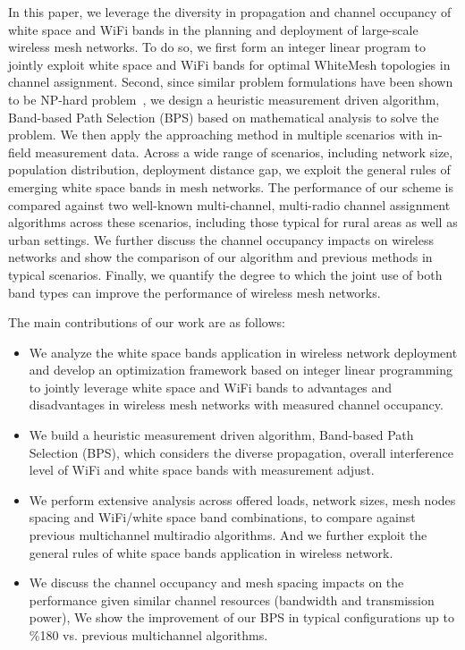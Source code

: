 In this paper, we leverage the diversity in propagation and channel occupancy of
white space and WiFi bands in the planning and deployment
of large-scale wireless mesh networks. To do so, we first form an
integer linear program to jointly exploit white space and WiFi 
bands for optimal WhiteMesh topologies in channel assignment. 
Second, since similar problem formulations have been shown to 
be NP-hard problem~\cite{jain2005impact,doraghinejad2014channel}, 
we design a heuristic measurement driven algorithm, Band-based 
Path Selection (BPS) based on mathematical analysis to solve the problem. 
We then apply the approaching method in multiple scenarios with in-field
measurement data. Across a wide range of scenarios, including 
network size, population distribution, deployment distance gap, we 
exploit the general rules of emerging white space bands in mesh networks. 
The performance of our scheme is compared against two well-known 
multi-channel, multi-radio channel assignment algorithms across 
these scenarios, including those typical for rural areas as well 
as urban settings. We further discuss the channel occupancy 
impacts on wireless networks and show the comparison of our
algorithm and previous methods in typical scenarios. 
Finally, we quantify the degree to which the joint use of 
both band types can improve the performance of wireless mesh networks.


The main contributions of our work are as follows:
\begin{itemize}
\item We analyze the white space bands application in wireless 
network deployment and develop an optimization framework based on integer
linear programming to jointly leverage white space and WiFi bands
to advantages and disadvantages in wireless mesh networks with measured 
channel occupancy.  
\item We build a heuristic measurement driven algorithm, Band-based Path 
Selection (BPS), which considers the diverse propagation, overall interference 
level of WiFi and white space bands with measurement adjust.  
\item We perform extensive analysis across offered loads,
network sizes, mesh nodes spacing and WiFi/white space band combinations, to 
compare against previous multichannel multiradio algorithms. And we
further exploit the general rules of white space bands application in wireless network.  
\item We discuss the channel occupancy and mesh spacing impacts 
on the performance given similar channel resources (bandwidth and
transmission power), We show the improvement of our BPS in typical
configurations up to \%180 vs. previous multichannel algorithms.
\end{itemize}


